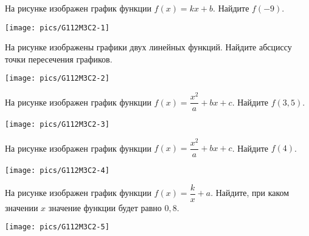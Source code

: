 %
%
%
%
\begin{class}[number=1]
	\begin{listofex}
		\item
		\begin{minipage}[t]{0.67\textwidth}
			На рисунке изображен график функции \( f(x)=kx+b \). Найдите \( f(-9) \).
		\end{minipage}
		\begin{minipage}[c]{0.2\textwidth}
			\texttt{[image: pics/G112M3C2-1]}
		\end{minipage}
		\item
		\begin{minipage}[t]{0.67\textwidth}
			На рисунке изображены графики двух линейных функций. Найдите абсциссу точки пересечения графиков.
		\end{minipage}
		\begin{minipage}[c]{0.2\textwidth}
			\texttt{[image: pics/G112M3C2-2]}
		\end{minipage}
		\item
		\begin{minipage}[t]{0.57\textwidth}
			На рисунке изображен график функции \( f(x)=\dfrac{x^2}{a}+bx+c \). Найдите \( f(3,5) \).
		\end{minipage}
		\begin{minipage}[c]{0.3\textwidth}
			\texttt{[image: pics/G112M3C2-3]}
		\end{minipage}
		\item
		\begin{minipage}[t]{0.57\textwidth}
			На рисунке изображен график функции \( f(x)=\dfrac{x^2}{a}+bx+c \). Найдите \( f(4) \).
		\end{minipage}
		\begin{minipage}[c]{0.3\textwidth}
			\texttt{[image: pics/G112M3C2-4]}
		\end{minipage}
		\item
		\begin{minipage}[t]{0.57\textwidth}
			На рисунке изображен график функции \( f(x)=\dfrac{k}{x}+a \). Найдите, при каком значении \( x \) значение функции будет равно \( 0,8 \).
		\end{minipage}
		\begin{minipage}[c]{0.3\textwidth}
			\texttt{[image: pics/G112M3C2-5]}

\end{minipage}
\end{listofex}
\end{class}
